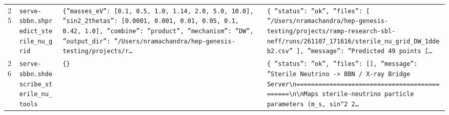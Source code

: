 \documentclass[11pt,a4paper]{article}
\begin{document}
\begin{longtable}{@{}p{}p{}p{}p{}@{}}
25 & \texttt{serve-sbbn.sh}\newline\texttt{predict\_\allowbreak{}sterile\_\allowbreak{}nu\_\allowbreak{}grid} & \texttt{\{''masses\_\allowbreak{}eV'':\allowbreak{} [0.1,\allowbreak{} 0.5,\allowbreak{} 1.0,\allowbreak{} 1.14,\allowbreak{} 2.0,\allowbreak{} 5.0,\allowbreak{} 10.0]\allowbreak{},\allowbreak{} ''sin2\_\allowbreak{}2thetas'':\allowbreak{} [0.0001,\allowbreak{} 0.001,\allowbreak{} 0.01,\allowbreak{} 0.05,\allowbreak{} 0.1,\allowbreak{} 0.42,\allowbreak{} 1.0]\allowbreak{},\allowbreak{} ''combine'':\allowbreak{} ''product'',\allowbreak{} ''mechanism'':\allowbreak{} ''DW'',\allowbreak{} ''output\_\allowbreak{}dir'':\allowbreak{} ''/\allowbreak{}Users/\allowbreak{}nramachandra/\allowbreak{}hep-genesis-testing/\allowbreak{}projects/\allowbreak{}r\ldots{}\allowbreak{}} & \texttt{\{   ''status'':\allowbreak{} ''ok'',\allowbreak{}   ''files'':\allowbreak{} [     ''/\allowbreak{}Users/\allowbreak{}nramachandra/\allowbreak{}hep-genesis-testing/\allowbreak{}projects/\allowbreak{}ramp-research-sbl-neff/\allowbreak{}runs/\allowbreak{}261107\_\allowbreak{}171616/\allowbreak{}sterile\_\allowbreak{}nu\_\allowbreak{}grid\_\allowbreak{}DW\_\allowbreak{}1ddeb2.csv''   ]\allowbreak{},\allowbreak{}   ''message'':\allowbreak{} ''Predicted 49 points [\ldots{}\allowbreak{}} \\
26 & \texttt{serve-sbbn.sh}\newline\texttt{describe\_\allowbreak{}sterile\_\allowbreak{}nu\_\allowbreak{}tools} & \texttt{\{\}\allowbreak{}} & \texttt{\{   ''status'':\allowbreak{} ''ok'',\allowbreak{}   ''files'':\allowbreak{} []\allowbreak{},\allowbreak{}   ''message'':\allowbreak{} ''Sterile Neutrino -\textgreater{}\allowbreak{} BBN /\allowbreak{} X-ray Bridge Server\textbackslash{}\allowbreak{}n=\allowbreak{}=\allowbreak{}=\allowbreak{}=\allowbreak{}=\allowbreak{}=\allowbreak{}=\allowbreak{}=\allowbreak{}=\allowbreak{}=\allowbreak{}=\allowbreak{}=\allowbreak{}=\allowbreak{}=\allowbreak{}=\allowbreak{}=\allowbreak{}=\allowbreak{}=\allowbreak{}=\allowbreak{}=\allowbreak{}=\allowbreak{}=\allowbreak{}=\allowbreak{}=\allowbreak{}=\allowbreak{}=\allowbreak{}=\allowbreak{}=\allowbreak{}=\allowbreak{}=\allowbreak{}=\allowbreak{}=\allowbreak{}=\allowbreak{}=\allowbreak{}=\allowbreak{}=\allowbreak{}=\allowbreak{}=\allowbreak{}=\allowbreak{}=\allowbreak{}=\allowbreak{}=\allowbreak{}=\allowbreak{}=\allowbreak{}=\allowbreak{}\textbackslash{}\allowbreak{}n\textbackslash{}\allowbreak{}nMaps sterile-neutrino particle parameters (m\_\allowbreak{}s,\allowbreak{} sin\textasciicircum{}\allowbreak{}2 2\ldots{}\allowbreak{}} \\

\end{longtable}
\end{document}
